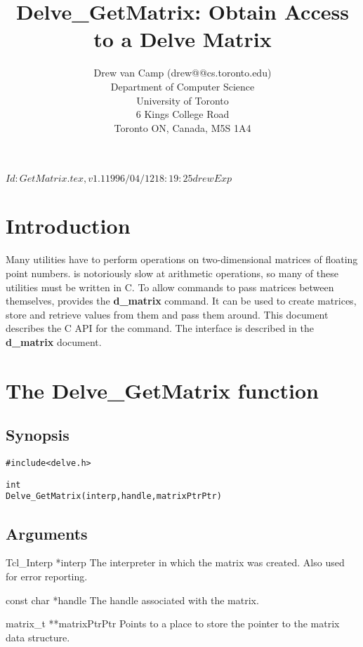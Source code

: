 \documentclass{article}
\newcommand{\dmatrix}{\textbf{d\_matrix}}
\newcommand{\getmatrix}{\textbf{Delve\_GetMatrix}}
\begin{document}
\rcsInfo $Id: GetMatrix.tex,v 1.1 1996/04/12 18:19:25 drew Exp $

\title{Delve\_GetMatrix: Obtain Access to a Delve Matrix}
\author{Drew van Camp (drew@@cs.toronto.edu)\\[1ex]
	Department of Computer Science\\
	University of Toronto\\
	6 Kings College Road\\
	Toronto ON, Canada, M5S 1A4}

\vfil
\maketitle
\vfil
{}
\vfil
\clearpage

\section{Introduction}

Many \delve{} utilities have to perform operations on two-dimensional
matrices of floating point numbers.  \tcl{} is notoriously slow at
arithmetic operations, so many of these utilities must be written in
C.  To allow commands to pass matrices between themselves, \delve{}
provides the \dmatrix{} command.  It can be used to create matrices,
store and retrieve values from them and pass them around.  This
document describes the C API for the command.  The \tcl{} interface is
described in the \textbf{d\_matrix} document.

\section{The \getmatrix{} function}
\subsection{Synopsis}
\begin{alltt}
#include <delve.h>

int
Delve_GetMatrix(interp, handle, matrixPtrPtr)
\end{alltt}
\subsection{Arguments}
\begin{options}
\item[Tcl\_Interp *interp]
The interpreter in which the matrix was created.  Also used for error
reporting. 
\item[const char *handle]
The handle associated with the matrix.
\item[matrix\_t **matrixPtrPtr]
Points to a place to store the pointer to the matrix data structure.
\end{options}
\end{document}
